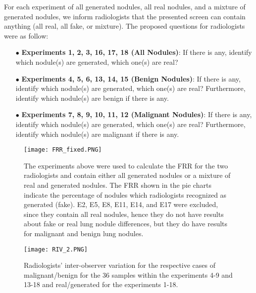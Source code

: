 \documentclass{article}
\begin{document}
For each experiment of all generated nodules, all real nodules, and a mixture of generated nodules, we inform radiologists that the presented screen can contain anything (all real, all fake, or mixture). The proposed questions for radiologists were as follow:

\begin{itemize}
\item[$\bullet$] \textbf{Experiments 1, 2, 3, 16, 17, 18 (All Nodules)}: If there is any, identify which nodule(s) are generated, which one(s) are real? 
\item[$\bullet$] \textbf{Experiments 4, 5, 6, 13, 14, 15 (Benign Nodules)}: If there is any, identify which nodule(s) are generated, which one(s) are real?  Furthermore, identify which nodule(s) are benign if there is any.
\item[$\bullet$] \textbf{Experiments 7, 8, 9, 10, 11, 12 (Malignant Nodules)}: If there is any, identify which nodule(s) are generated, which one(s) are real? Furthermore, identify which nodule(s) are malignant if there is any.
\end{itemize}

\begin{figure*}
\begin{center}

\texttt{[image: FRR\_fixed.PNG]}
\caption{The experiments above were used to calculate the FRR for the two radiologists and contain either all generated nodules or a mixture of real and generated nodules. The FRR shown in the pie charts indicate the percentage of nodules which radiologists recognized as generated (fake). E2, E5, E8, E11, E14, and E17 were excluded, since they contain all real nodules, hence they do not have results about fake or real lung nodule differences, but they do have results for malignant and benign lung nodules.}
  \label{FRR}
\end{center}
\end{figure*}

\begin{figure}
\centering
\texttt{[image: RIV\_2.PNG]}
 \caption{Radiologists' inter-observer variation for the respective cases of malignant/benign for the 36 samples within the experiments 4-9 and 13-18 and real/generated for the experiments 1-18.}
 \label{RIV}
\end{figure}

\vspace{-10 px}
\end{document}
